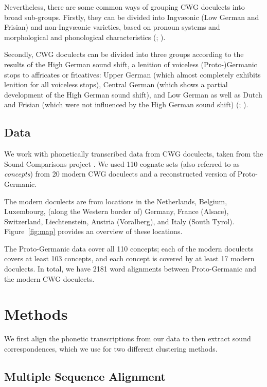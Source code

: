 \documentclass[a4paper, 11pt]{article}
\begin{document}
Nevertheless, there are some common ways of grouping CWG doculects into broad sub-groups.
Firstly, they can be divided into Ingv{\ae}onic (Low German and Frisian) and non-Ingv{\ae}onic varieties, based on pronoun systems and morphological and phonological characteristics
(\citet{stiles2013pan-west}; \citet[pp.~7--8]{harbert2007germanic}).

Secondly, 
CWG doculects can be divided into three groups according to
the results of the High German sound shift, a lenition of voiceless (Proto-)Germanic stops to affricates or fricatives:
Upper German (which almost completely
exhibits lenition for all voiceless stops),
Central German (which shows a
partial development of the High German sound shift),
and Low German as well as Dutch and Frisian (which were not influenced by the High German sound shift)
(\citet[pp. 33, 55]{noble1983modern}; \citet[pp.~64,~230--231]{koenig2015dtv}).


\subsection{Data}

We work with phonetically transcribed data from
CWG doculects, taken from the Sound Comparisons project 
\citep{heggarty2018sound}.
We used 110 cognate sets (also referred to as \textit{concepts})
from 20 modern CWG doculects
and a reconstructed version of Proto-Germanic.

The modern doculects are from locations in the
Netherlands, Belgium, Luxembourg, (along the Western border of) Germany,
France (Alsace), Switzerland, Liechtenstein, Austria (Voralberg), and Italy (South Tyrol).
Figure~\ref{fig:map} provides an overview of these locations.

The Proto-Germanic data cover all 110 concepts; each of the modern doculects covers at least 103 concepts, and each concept is covered by at least 17 modern doculects.
In total, we have 2181 word alignments between Proto-Germanic and the modern CWG doculects.


\section{Methods}

We first align the phonetic transcriptions from our data
to then extract sound correspondences, which we use for
two different clustering methods.

\subsection{Multiple Sequence Alignment}
\end{document}
